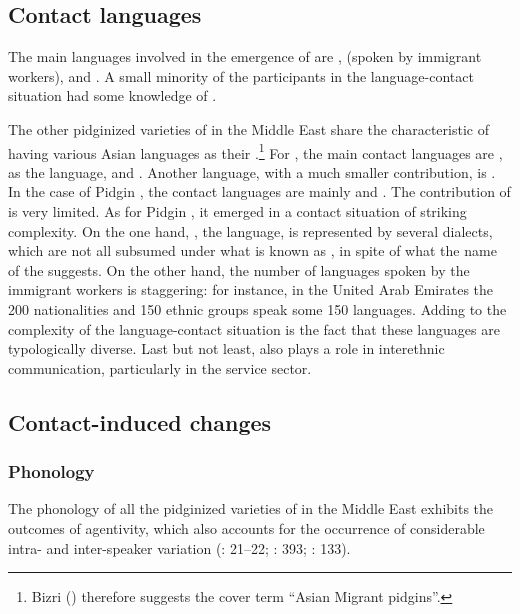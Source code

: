 \documentclass[output=paper]{langsci/langscibook}
\begin{document}
 
 \subsection{Contact languages}


The main languages involved in the emergence of   are ,   (spoken by immigrant workers), and  . A small minority of the participants in the language-contact situation had some knowledge of .

The other pidginized varieties of  in the Middle East share the characteristic of having various Asian languages as their .\footnote{Bizri (\citeyear[385]{Bizri2014}) therefore suggests the cover term “Asian Migrant  pidgins”.} For , the main contact languages are  , as the  language, and . Another language, with a much smaller contribution, is . In the case of  Pidgin , the contact languages are mainly   and . The contribution of  is very limited. As for  Pidgin , it emerged in a contact situation of striking complexity. On the one hand, , the  language, is represented by several dialects, which are not all subsumed under what is known as  , in spite of what the name of the  suggests. On the other hand, the number of languages spoken by the immigrant workers is staggering: for instance, in the United Arab Emirates the 200 nationalities and 150 ethnic groups speak some 150 languages. Adding to the complexity of the language-contact situation is the fact that these languages are typologically diverse. Last but not least,  also plays a role in interethnic communication, particularly in the service sector.


 
 \subsection{Contact-induced changes}
 \subsubsection{Phonology}

The phonology of all the pidginized varieties of  in the Middle East exhibits the outcomes of  agentivity, which also accounts for the occurrence of considerable intra- and  inter-speaker variation (\citealt{Avram2010}: 21–22; \citealt{Bizri2014}: 393; \citealt{Avram2017article}: 133).
\end{document}
